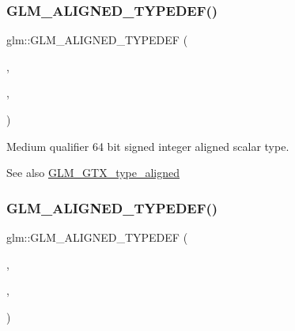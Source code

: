 \subsubsection{\texorpdfstring{G\+L\+M\+\_\+\+A\+L\+I\+G\+N\+E\+D\+\_\+\+T\+Y\+P\+E\+D\+E\+F()}{GLM\_ALIGNED\_TYPEDEF()}\hspace{0.1cm}{\footnotesize\ttfamily [24/209]}}
{\footnotesize\ttfamily glm\+::\+G\+L\+M\+\_\+\+A\+L\+I\+G\+N\+E\+D\+\_\+\+T\+Y\+P\+E\+D\+EF (\begin{DoxyParamCaption}\item[{\mbox{\hyperlink{group__gtc__type__precision_ga90fedf6c701ffbe00535156715e50787}{mediump\+\_\+i64}}}]{,  }\item[{aligned\+\_\+mediump\+\_\+i64}]{,  }\item[{8}]{ }\end{DoxyParamCaption})}

Medium qualifier 64 bit signed integer aligned scalar type. \begin{DoxySeeAlso}{See also}
\mbox{\hyperlink{group__gtx__type__aligned}{G\+L\+M\+\_\+\+G\+T\+X\+\_\+type\+\_\+aligned}} 
\end{DoxySeeAlso}
\mbox{\label{group__gtx__type__aligned_ga56c5ca60813027b603c7b61425a0479d}} 
\subsubsection{\texorpdfstring{G\+L\+M\+\_\+\+A\+L\+I\+G\+N\+E\+D\+\_\+\+T\+Y\+P\+E\+D\+E\+F()}{GLM\_ALIGNED\_TYPEDEF()}\hspace{0.1cm}{\footnotesize\ttfamily [25/209]}}
{\footnotesize\ttfamily glm\+::\+G\+L\+M\+\_\+\+A\+L\+I\+G\+N\+E\+D\+\_\+\+T\+Y\+P\+E\+D\+EF (\begin{DoxyParamCaption}\item[{\mbox{\hyperlink{group__gtc__type__precision_ga57c86999e666760c304453f9bfdc09d1}{highp\+\_\+int8}}}]{,  }\item[{aligned\+\_\+highp\+\_\+int8}]{,  }\item[{1}]{ }\end{DoxyParamCaption})}


